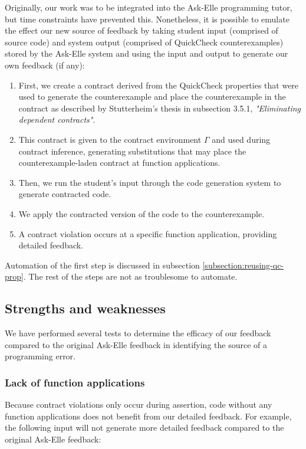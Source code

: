 \documentclass[10pt]{report}
\begin{document}
{Originally, our work was to be integrated into the Ask-Elle programming tutor, but time constraints have prevented this.
Nonetheless, it is possible to emulate the effect our new source of feedback by taking student input (comprised of source code) and system output (comprised of QuickCheck counterexamples) stored by the Ask-Elle system and using the input and output to generate our own feedback (if any):

\begin{enumerate}
	\item First, we create a contract derived from the QuickCheck properties that were used to generate the counterexample and place the counterexample in the contract as described by Stutterheim's thesis in subsection 3.5.1, \textit{"Eliminating dependent contracts"}.
	\item This contract is given to the contract environment $\Gamma$ and used during contract inference, generating substitutions that may place the counterexample-laden contract at function applications.
	\item Then, we run the student's input through the code generation system to generate contracted code.
	\item We apply the contracted version of the code to the counterexample.
	\item A contract violation occurs at a specific function application, providing detailed feedback.
\end{enumerate}

Automation of the first step is discussed in subsection \ref{subsection:reusing-qc-prop}. The rest of the steps are not as troublesome to automate.

\subsection{Strengths and weaknesses}

We have performed several tests to determine the efficacy of our feedback compared to the original Ask-Elle feedback in identifying the source of a programming error.

\subsubsection{Lack of function applications}

Because contract violations only occur during assertion, code without any function applications does not benefit from our detailed feedback.
For example, the following input will not generate more detailed feedback compared to the original Ask-Elle feedback:

}
\end{document}
